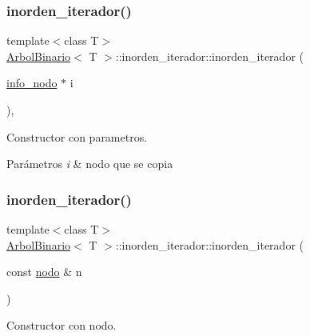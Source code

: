\subsubsection{\texorpdfstring{inorden\+\_\+iterador()}{inorden\_iterador()}\hspace{0.1cm}{\footnotesize\ttfamily [1/3]}}
{\footnotesize\ttfamily template$<$class T$>$ \\
\hyperlink{classArbolBinario}{Arbol\+Binario}$<$ T $>$\+::inorden\+\_\+iterador\+::inorden\+\_\+iterador (\begin{DoxyParamCaption}\item[{\hyperlink{structArbolBinario_1_1info__nodo}{info\+\_\+nodo} $\ast$}]{i }\end{DoxyParamCaption})\hspace{0.3cm}{\ttfamily [inline]}, {\ttfamily [private]}}



Constructor con parametros. 


\begin{DoxyParams}{Parámetros}
{\em i} & nodo que se copia \\
\hline
\end{DoxyParams}
\mbox{\label{classArbolBinario_1_1inorden__iterador_afd45e81f9c3c521104938227b17316a9}} 
\subsubsection{\texorpdfstring{inorden\+\_\+iterador()}{inorden\_iterador()}\hspace{0.1cm}{\footnotesize\ttfamily [2/3]}}
{\footnotesize\ttfamily template$<$class T$>$ \\
\hyperlink{classArbolBinario}{Arbol\+Binario}$<$ T $>$\+::inorden\+\_\+iterador\+::inorden\+\_\+iterador (\begin{DoxyParamCaption}\item[{const \hyperlink{classArbolBinario_1_1nodo}{nodo} \&}]{n }\end{DoxyParamCaption})\hspace{0.3cm}{\ttfamily [inline]}}



Constructor con nodo. 


